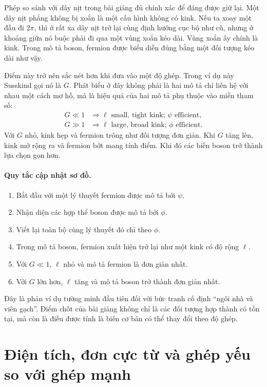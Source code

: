 Phép so sánh với dây nịt trong bài giảng đủ chính xác để đáng được giữ lại. Một dây nịt phẳng không bị xoắn là một cấu hình không có kink. Nếu ta xoay một đầu đi \(2\pi\), thì ở rất xa dây nịt trở lại cùng định hướng cục bộ như cũ, nhưng ở khoảng giữa nó buộc phải đi qua một vùng xoắn kéo dài. Vùng xoắn ấy chính là kink. Trong mô tả boson, fermion được biểu diễn đúng bằng một đối tượng kéo dài như vậy.

Điểm này trở nên sắc nét hơn khi đưa vào một độ ghép. Trong ví dụ này Susskind gọi nó là \(G\). Phát biểu ở đây không phải là hai mô tả chỉ liên hệ với nhau một cách mơ hồ, mà là hiệu quả của hai mô tả phụ thuộc vào miền tham số:
\begin{align}
G \ll 1
&\Rightarrow
\ell\text{ small, tight kink; }\psi\text{ efficient},\\
G \gg 1
&\Rightarrow
\ell\text{ large, broad kink; }\phi\text{ efficient}.
\end{align}
Với \(G\) nhỏ, kink hẹp và fermion trông như đối tượng đơn giản. Khi \(G\) tăng lên, kink mở rộng ra và fermion bớt mang tính điểm. Khi đó các biến boson trở thành lựa chọn gọn hơn.

\paragraph{Quy tắc cập nhật sơ đồ.}
\begin{enumerate}
\item Bắt đầu với một lý thuyết fermion được mô tả bởi \(\psi\).
\item Nhận diện các hợp thể boson được mô tả bởi \(\phi\).
\item Viết lại toàn bộ cùng lý thuyết đó chỉ theo \(\phi\).
\item Trong mô tả boson, fermion xuất hiện trở lại như một kink có độ rộng \(\ell\).
\item Với \(G\ll 1\), \(\ell\) nhỏ và mô tả fermion là đơn giản nhất.
\item Với \(G\) lớn hơn, \(\ell\) tăng và mô tả boson trở thành đơn giản nhất.
\end{enumerate}

Đây là phản ví dụ tường minh đầu tiên đối với bức tranh cố định ``ngôi nhà và viên gạch''. Điểm chốt của bài giảng không chỉ là các đối tượng hợp thành có tồn tại, mà còn là điều được tính là biến cơ bản có thể thay đổi theo độ ghép.

\section{Điện tích, đơn cực từ và ghép yếu so với ghép mạnh}

